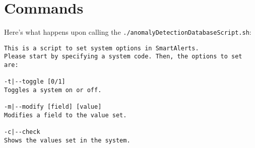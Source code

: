 \documentclass[12pt,titlepage]{article}
\begin{document}
\newpage
\section{Commands}\label{comm}
Here's what happens upon calling the \texttt{./anomalyDetectionDatabaseScript.sh}:
\begin{verbatim}
This is a script to set system options in SmartAlerts.
Please start by specifying a system code. Then, the options to set are:

-t|--toggle [0/1]
Toggles a system on or off.

-m|--modify [field] [value]
Modifies a field to the value set.

-c|--check
Shows the values set in the system.
\end{verbatim}


\newpage
\pagestyle{backpage}
\afterpage{\PageBackground\null}
  
\end{document}
